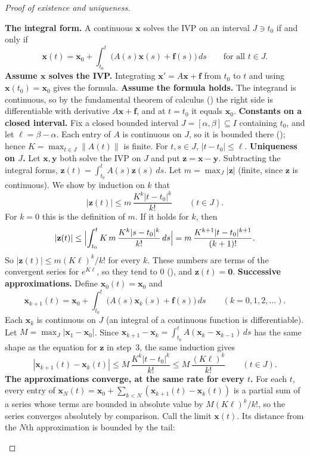 \documentclass[10pt]{scrartcl}
\newcommand{\vv}[1]{\mathbf{#1}}
\begin{document}
\begin{proof}[Proof of existence and uniqueness]
  \begin{steps}
    \ii \textbf{The integral form.} A continuous $\vv x$ solves the IVP on an interval $J\ni t_0$ if and only if
    \[
      \vv x(t)=\vv x_0+\int_{t_0}^t\bigl(A(s)\vv x(s)+\vv f(s)\bigr)\,ds\qquad\text{for all }t\in J.
    \]
    \textbf{Assume $\vv x$ solves the IVP.} Integrating $\vv x'=A\vv x+\vv f$ from $t_0$ to $t$ and using $\vv x(t_0)=\vv x_0$ gives the formula. \textbf{Assume the formula holds.} The integrand is continuous, so by the fundamental theorem of calculus () the right side is differentiable with derivative $A\vv x+\vv f$, and at $t=t_0$ it equals $\vv x_0$.
    \ii \textbf{Constants on a closed interval.} Fix a closed bounded interval $J=[\alpha,\beta]\subseteq I$ containing $t_0$, and let $\ell=\beta-\alpha$. Each entry of $A$ is continuous on $J$, so it is bounded there (); hence $K=\max_{t\in J}\|A(t)\|$ is finite. For $t,s\in J$, $|t-t_0|\le\ell$.
    \ii \textbf{Uniqueness on $J$.} Let $\vv x,\vv y$ both solve the IVP on $J$ and put $\vv z=\vv x-\vv y$. Subtracting the integral forms, $\vv z(t)=\int_{t_0}^tA(s)\vv z(s)\,ds$. Let $m=\max_J|\vv z|$ (finite, since $\vv z$ is continuous). We show by induction on $k$ that
    \[
      |\vv z(t)|\le m\,\frac{K^k|t-t_0|^k}{k!}\qquad(t\in J).
    \]
    For $k=0$ this is the definition of $m$. If it holds for $k$, then
    \[
      |\vv z(t)|\le\Bigl|\int_{t_0}^tK\,m\,\frac{K^k|s-t_0|^k}{k!}\,ds\Bigr|=m\,\frac{K^{k+1}|t-t_0|^{k+1}}{(k+1)!}.
    \]
    So $|\vv z(t)|\le m(K\ell)^k/k!$ for every $k$. These numbers are terms of the convergent series for $e^{K\ell}$, so they tend to $0$ (), and $\vv z(t)=\vv 0$.
    \ii \textbf{Successive approximations.} Define $\vv x_0(t)=\vv x_0$ and
    \[
      \vv x_{k+1}(t)=\vv x_0+\int_{t_0}^t\bigl(A(s)\vv x_k(s)+\vv f(s)\bigr)\,ds\qquad(k=0,1,2,\dots).
    \]
    Each $\vv x_k$ is continuous on $J$ (an integral of a continuous function is differentiable). Let $M=\max_J|\vv x_1-\vv x_0|$. Since $\vv x_{k+1}-\vv x_k=\int_{t_0}^tA(\vv x_k-\vv x_{k-1})\,ds$ has the same shape as the equation for $\vv z$ in step~3, the same induction gives
    \[
      |\vv x_{k+1}(t)-\vv x_k(t)|\le M\,\frac{K^k|t-t_0|^k}{k!}\le M\,\frac{(K\ell)^k}{k!}\qquad(t\in J).
    \]
    \ii \textbf{The approximations converge, at the same rate for every $t$.} For each $t$, every entry of $\vv x_N(t)=\vv x_0+\sum_{k<N}(\vv x_{k+1}(t)-\vv x_k(t))$ is a partial sum of a series whose terms are bounded in absolute value by $M(K\ell)^k/k!$, so the series converges absolutely by comparison. Call the limit $\vv x(t)$. Its distance from the $N$th approximation is bounded by the tail:

\end{steps}
\end{proof}
\end{document}
